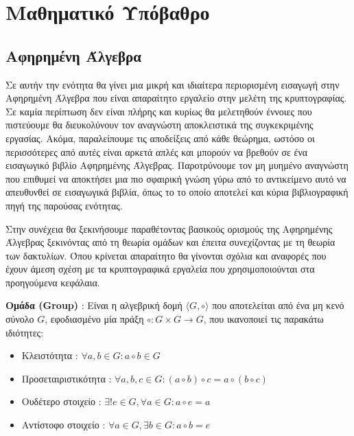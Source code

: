 \section{Μαθηματικό Υπόβαθρο}
\label{section:math-backgorund}

\subsection{Αφηρημένη Άλγεβρα}

Σε αυτήν την ενότητα θα γίνει μια μικρή και ιδιαίτερα περιορισμένη εισαγωγή στην Αφηρημένη Άλγεβρα που είναι απαραίτητο εργαλείο στην μελέτη της κρυπτογραφίας. Σε καμία περίπτωση δεν είναι πλήρης και κυρίως θα μελετηθούν έννοιες που πιστεύουμε θα διευκολύνουν τον αναγνώστη αποκλειστικά της συγκεκριμένης εργασίας. Ακόμα, παραλείπουμε τις αποδείξεις από κάθε θεώρημα, ωστόσο οι περισσότερες από αυτές είναι αρκετά απλές και μπορούν να βρεθούν σε ένα εισαγωγικό βιβλίο Αφηρημένης Άλγεβρας. Παροτρύνουμε τον μη μυημένο αναγνώστη που επιθυμεί να αποκτήσει μια πιο σφαιρική γνώση γύρω από το αντικείμενο αυτό να απευθυνθεί σε εισαγωγικά βιβλία, όπως το \cite{pinter2010book} το οποίο αποτελεί και κύρια βιβλιογραφική πηγή της παρούσας ενότητας.

Στην συνέχεια θα ξεκινήσουμε παραθέτοντας βασικούς ορισμούς της Αφηρημένης Άλγεβρας ξεκινόντας από τη θεωρία ομάδων και έπειτα συνεχίζοντας με τη θεωρία των δακτυλίων. Όπου κρίνεται απαραίτητο θα γίνονται σχόλια και αναφορές που έχουν άμεση σχέση με τα κρυπτογραφικά εργαλεία που χρησιμοποιούνται στα προηγούμενα κεφάλαια.

\begin{definition}
\textbf{Ομάδα (Group)} : Είναι η αλγεβρική δομή $\langle G, \circ \rangle$ που αποτελείται από ένα μη κενό σύνολο $G$, εφοδιασμένο μία πράξη $\circ : G \times G \rightarrow G$, που ικανοποιεί τις παρακάτω ιδιότητες:

\begin{itemize}
    \item Κλειστότητα : $\forall a,b \in G : a \circ b \in G$
    \item Προσεταιριστικότητα : $\forall a,b,c \in G : (a \circ b) \circ c = a \circ (b \circ c)$
    \item Ουδέτερο στοιχείο : $\exists! e \in G, \forall a \in G : a \circ e = a $
    \item Αντίστοφο στοιχείο : $\forall a \in G, \exists b \in G : a \circ b = e$
\end{itemize}
\end{definition}

